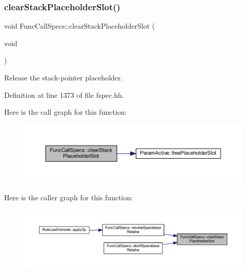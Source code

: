 \subsubsection{\texorpdfstring{clearStackPlaceholderSlot()}{clearStackPlaceholderSlot()}}
{\footnotesize\ttfamily void Func\+Call\+Specs\+::clear\+Stack\+Placeholder\+Slot (\begin{DoxyParamCaption}\item[{void}]{ }\end{DoxyParamCaption})\hspace{0.3cm}{\ttfamily [inline]}}



Release the stack-\/pointer placeholder. 



Definition at line 1373 of file fspec.\+hh.

Here is the call graph for this function\+:
\nopagebreak
\begin{figure}[H]
\begin{center}
\leavevmode
\includegraphics[width=350pt]{class_func_call_specs_a571062bec4389e2602577b6eed10cbf5_cgraph}
\end{center}
\end{figure}
Here is the caller graph for this function\+:
\nopagebreak
\begin{figure}[H]
\begin{center}
\leavevmode
\includegraphics[width=350pt]{class_func_call_specs_a571062bec4389e2602577b6eed10cbf5_icgraph}
\end{center}
\end{figure}
\mbox{\label{class_func_call_specs_ac649b58eb85cf052096ac32e5ced8607}} 
